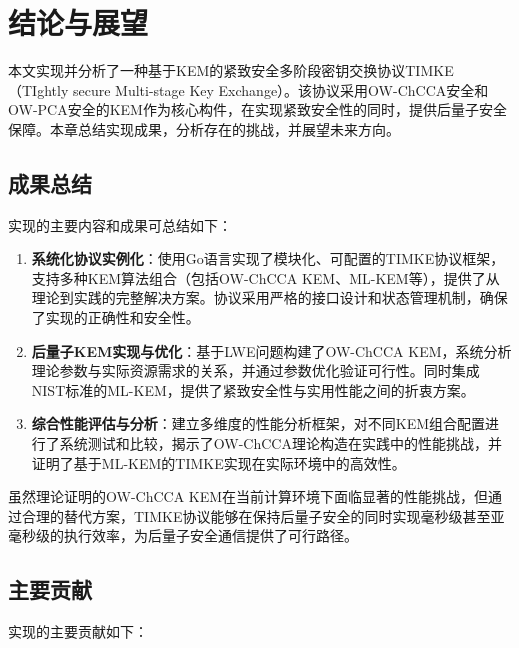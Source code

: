 \section{结论与展望}

本文实现并分析了一种基于KEM的紧致安全多阶段密钥交换协议TIMKE（TIghtly secure Multi-stage Key Exchange）。该协议采用OW-ChCCA安全和OW-PCA安全的KEM作为核心构件，在实现紧致安全性的同时，提供后量子安全保障。本章总结实现成果，分析存在的挑战，并展望未来方向。

\subsection{成果总结}

实现的主要内容和成果可总结如下：

\begin{enumerate}
  \item \textbf{系统化协议实例化}：使用Go语言实现了模块化、可配置的TIMKE协议框架，支持多种KEM算法组合（包括OW-ChCCA KEM、ML-KEM等），提供了从理论到实践的完整解决方案。协议采用严格的接口设计和状态管理机制，确保了实现的正确性和安全性。
    
  \item \textbf{后量子KEM实现与优化}：基于LWE问题构建了OW-ChCCA KEM，系统分析理论参数与实际资源需求的关系，并通过参数优化验证可行性。同时集成NIST标准的ML-KEM，提供了紧致安全性与实用性能之间的折衷方案。

  \item \textbf{综合性能评估与分析}：建立多维度的性能分析框架，对不同KEM组合配置进行了系统测试和比较，揭示了OW-ChCCA理论构造在实践中的性能挑战，并证明了基于ML-KEM的TIMKE实现在实际环境中的高效性。
\end{enumerate}

虽然理论证明的OW-ChCCA KEM在当前计算环境下面临显著的性能挑战，但通过合理的替代方案，TIMKE协议能够在保持后量子安全的同时实现毫秒级甚至亚毫秒级的执行效率，为后量子安全通信提供了可行路径。

\subsection{主要贡献}

实现的主要贡献如下：


